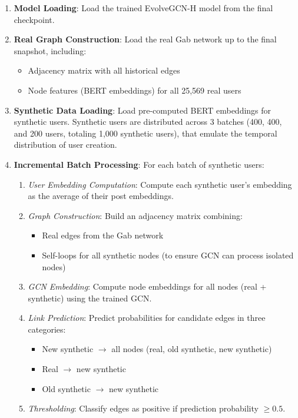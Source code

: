 \begin{enumerate}
	\item \textbf{Model Loading}: Load the trained EvolveGCN-H model from the final checkpoint.

	\item \textbf{Real Graph Construction}: Load the real Gab network up to the final snapshot, including:
	      \begin{itemize}
		      \item Adjacency matrix with all historical edges
		      \item Node features (BERT embeddings) for all 25,569 real users
	      \end{itemize}

	\item \textbf{Synthetic Data Loading}: Load pre-computed BERT embeddings for synthetic users. Synthetic users are distributed across 3 batches (400, 400, and 200 users, totaling 1,000 synthetic users), that emulate the temporal distribution of user creation.

	\item \textbf{Incremental Batch Processing}: For each batch of synthetic users:
	      \begin{enumerate}
		      \item \textit{User Embedding Computation}: Compute each synthetic user's embedding as the average of their post embeddings.
		      \item \textit{Graph Construction}: Build an adjacency matrix combining:
		            \begin{itemize}
			            \item Real edges from the Gab network
			            \item Self-loops for all synthetic nodes (to ensure GCN can process isolated nodes)
		            \end{itemize}
		      \item \textit{GCN Embedding}: Compute node embeddings for all nodes (real + synthetic) using the trained GCN.
		      \item \textit{Link Prediction}: Predict probabilities for candidate edges in three categories:
		            \begin{itemize}
			            \item New synthetic $\rightarrow$ all nodes (real, old synthetic, new synthetic)
			            \item Real $\rightarrow$ new synthetic
			            \item Old synthetic $\rightarrow$ new synthetic
		            \end{itemize}
		      \item \textit{Thresholding}: Classify edges as positive if prediction probability $\geq 0.5$.
	      \end{enumerate}
\end{enumerate}


